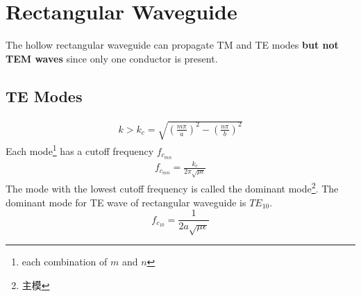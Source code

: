 \documentclass[a4paper]{report}
\begin{document}

\section{Rectangular Waveguide}
The hollow rectangular waveguide can propagate TM and TE modes \textbf{but not TEM waves} since only one conductor is present. 
\subsection{TE Modes}

\begin{align*}
  k>k_c=\sqrt{(\frac{m\pi}{a})^2-(\frac{n\pi}{b})^2}
\end{align*}
Each mode\footnote{each combination of $m$ and $n$} has a cutoff frequency $f_{c_{mn}}$
\begin{align*}
  f_{c_{mn}}=\frac{k_c}{2\pi\sqrt{\mu\epsilon}}
\end{align*}
The mode with the lowest cutoff frequency is called the dominant mode\footnote{主模}. The dominant mode for TE wave of rectangular waveguide is $TE_{10}$. 
$$
f_{c_{10}}=\frac{1}{2a\sqrt{\mu\epsilon}}
$$
\end{document}
